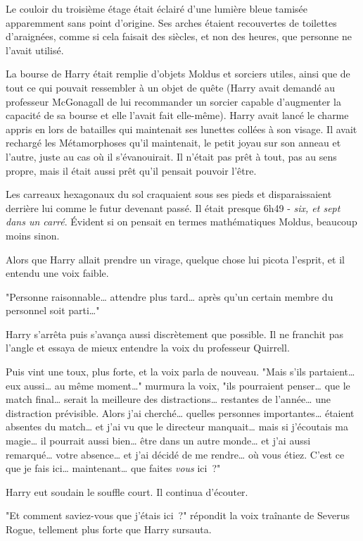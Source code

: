 Le couloir du troisième étage était éclairé d'une lumière bleue tamisée apparemment sans point d'origine. Ses arches étaient recouvertes de toilettes d'araignées, comme si cela faisait des siècles, et non des heures, que personne ne l'avait utilisé.

La bourse de Harry était remplie d'objets Moldus et sorciers utiles, ainsi que de tout ce qui pouvait ressembler à un objet de quête (Harry avait demandé au professeur McGonagall de lui recommander un sorcier capable d'augmenter la capacité de sa bourse et elle l'avait fait elle-même). Harry avait lancé le charme appris en lors de batailles qui maintenait ses lunettes collées à son visage. Il avait rechargé les Métamorphoses qu'il maintenait, le petit joyau sur son anneau et l'autre, juste au cas où il s'évanouirait. Il n'était pas prêt à tout, pas au sens propre, mais il était aussi prêt qu'il pensait pouvoir l'être.

Les carreaux hexagonaux du sol craquaient sous ses pieds et disparaissaient derrière lui comme le futur devenant passé. Il était presque 6h49 - \emph{six, et sept dans un carré}. Évident si on pensait en termes mathématiques Moldus, beaucoup moins sinon.

Alors que Harry allait prendre un virage, quelque chose lui picota l'esprit, et il entendu une voix faible.

"Personne raisonnable… attendre plus tard… après qu'un certain membre du personnel soit parti…"

Harry s'arrêta puis s'avança aussi discrètement que possible. Il ne franchit pas l'angle et essaya de mieux entendre la voix du professeur Quirrell.

Puis vint une toux, plus forte, et la voix parla de nouveau. "Mais s'ils partaient… eux aussi… au même moment…" murmura la voix, "ils pourraient penser… que le match final… serait la meilleure des distractions… restantes de l'année… une distraction prévisible. Alors j'ai cherché… quelles personnes importantes… étaient absentes du match… et j'ai vu que le directeur manquait… mais si j'écoutais ma magie… il pourrait aussi bien… être dans un autre monde… et j'ai aussi remarqué… votre absence… et j'ai décidé de me rendre… où vous étiez. C'est ce que je fais ici… maintenant… que faites \emph{vous} ici~?"

Harry eut soudain le souffle court. Il continua d'écouter.

"Et comment saviez-vous que j'étais ici~?" répondit la voix traînante de Severus Rogue, tellement plus forte que Harry sursauta.

